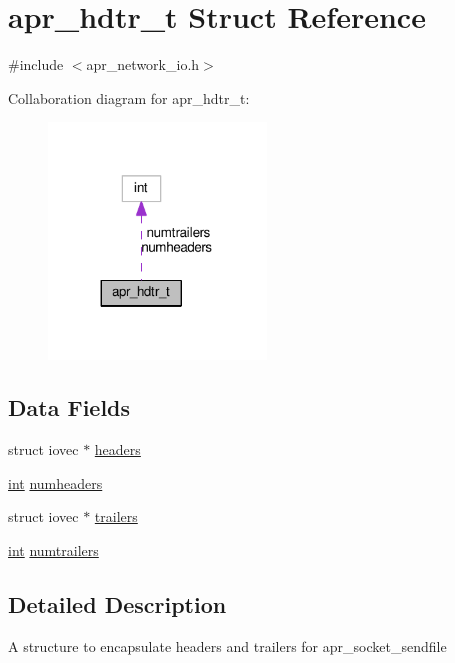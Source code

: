 \hypertarget{structapr__hdtr__t}{}\section{apr\+\_\+hdtr\+\_\+t Struct Reference}
\label{structapr__hdtr__t}


{\ttfamily \#include $<$apr\+\_\+network\+\_\+io.\+h$>$}



Collaboration diagram for apr\+\_\+hdtr\+\_\+t\+:
\nopagebreak
\begin{figure}[H]
\begin{center}
\leavevmode
\includegraphics[width=164pt]{structapr__hdtr__t__coll__graph}
\end{center}
\end{figure}
\subsection*{Data Fields}
\begin{DoxyCompactItemize}
\item 
struct iovec $\ast$ \hyperlink{structapr__hdtr__t_afc2035a3ef314f9aa6ae3aabe7c0dc72}{headers}
\item 
\hyperlink{pcre_8txt_a42dfa4ff673c82d8efe7144098fbc198}{int} \hyperlink{structapr__hdtr__t_a8915ade68ef06f4d23005ec0f81e9305}{numheaders}
\item 
struct iovec $\ast$ \hyperlink{structapr__hdtr__t_a538387cfa0065abc2bfa6ba7393fa3ee}{trailers}
\item 
\hyperlink{pcre_8txt_a42dfa4ff673c82d8efe7144098fbc198}{int} \hyperlink{structapr__hdtr__t_a9468659de891a5672b0b84cf442e9c7b}{numtrailers}
\end{DoxyCompactItemize}


\subsection{Detailed Description}
A structure to encapsulate headers and trailers for apr\+\_\+socket\+\_\+sendfile 

